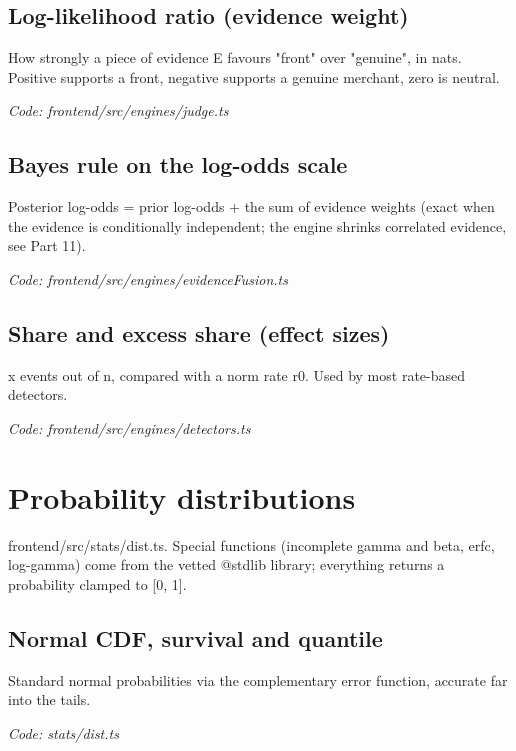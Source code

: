 \documentclass[11pt,a4paper]{article}
\newcommand{\where}[1]{\par{\small\itshape\color{mute}Code: #1}\par}
\begin{document}
\subsection*{Log-likelihood ratio (evidence weight)}
\par\smallskip\noindent{}\par\smallskip
How strongly a piece of evidence E favours "front" over "genuine", in nats. Positive supports a front, negative supports a genuine merchant, zero is neutral.
\where{frontend/src/engines/judge.ts}

\subsection*{Bayes rule on the log-odds scale}
\par\smallskip\noindent{}\par\smallskip
Posterior log-odds = prior log-odds + the sum of evidence weights (exact when the evidence is conditionally independent; the engine shrinks correlated evidence, see Part 11).
\where{frontend/src/engines/evidenceFusion.ts}

\subsection*{Share and excess share (effect sizes)}
\par\smallskip\noindent{}\par\smallskip
x events out of n, compared with a norm rate r0. Used by most rate-based detectors.
\where{frontend/src/engines/detectors.ts}

\clearpage
\section{Probability distributions}
{\color{mute}frontend/src/stats/dist.ts. Special functions (incomplete gamma and beta, erfc, log-gamma) come from the vetted @stdlib library; everything returns a probability clamped to [0, 1].}

\subsection*{Normal CDF, survival and quantile}
\par\smallskip\noindent{}\par\smallskip
\par\smallskip\noindent{}\par\smallskip
Standard normal probabilities via the complementary error function, accurate far into the tails.
\where{stats/dist.ts}
\end{document}
